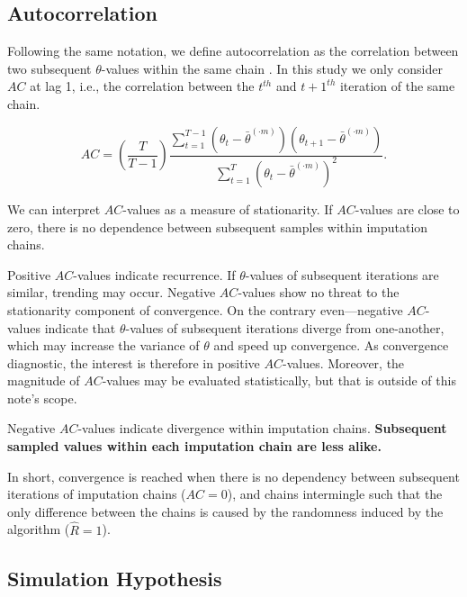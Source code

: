 \documentclass[Royal,times,sageh]{sagej}
\begin{document}
\hypertarget{autocorrelation}{%
\subsection{Autocorrelation}\label{autocorrelation}}

Following the same notation, we define autocorrelation as the
correlation between two subsequent \(\theta\)-values within the same
chain \citep[p.~147]{lync07}. In this study we only consider \(AC\) at
lag 1, i.e., the correlation between the \(t^{th}\) and \(t+1^{th}\)
iteration of the same chain.

\begin{equation*}
AC = \left( \frac{T}{T-1} \right) \frac{\sum_{t=1}^{T-1}(\theta_t - \bar{\theta}^{(\cdot m)})(\theta_{t+1} - \bar{\theta}^{(\cdot m)})}{\sum_{t=1}^{T}(\theta_t - \bar{\theta}^{(\cdot m)})^2}.
\end{equation*}

We can interpret \(AC\)-values as a measure of stationarity. If
\(AC\)-values are close to zero, there is no dependence between
subsequent samples within imputation chains.

Positive \(AC\)-values indicate recurrence. If \(\theta\)-values of
subsequent iterations are similar, trending may occur. Negative
\(AC\)-values show no threat to the stationarity component of
convergence. On the contrary even---negative \(AC\)-values indicate that
\(\theta\)-values of subsequent iterations diverge from one-another,
which may increase the variance of \(\theta\) and speed up convergence.
As convergence diagnostic, the interest is therefore in positive
\(AC\)-values. Moreover, the magnitude of \(AC\)-values may be evaluated
statistically, but that is outside of this note's scope.

Negative \(AC\)-values indicate divergence within imputation chains.
\textbf{Subsequent sampled values within each imputation chain are less
alike.}

In short, convergence is reached when there is no dependency between
subsequent iterations of imputation chains (\(AC = 0\)), and chains
intermingle such that the only difference between the chains is caused
by the randomness induced by the algorithm (\(\widehat{R} = 1\)).

\hypertarget{simulation-hypothesis}{%
\subsection{Simulation Hypothesis}\label{simulation-hypothesis}}
\end{document}
